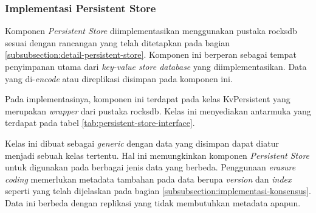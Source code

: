 \subsubsection{Implementasi Persistent Store}
\label{subsubsection:implementasi-persistent-store}

Komponen \textit{Persistent Store} diimplementasikan menggunakan pustaka rocksdb sesuai dengan rancangan yang telah ditetapkan pada bagian \ref{subsubsection:detail-persistent-store}. Komponen ini berperan sebagai tempat penyimpanan utama dari \textit{key-value store database} yang diimplementasikan. Data yang di-\textit{encode} atau direplikasi disimpan pada komponen ini.

Pada implementasinya, komponen ini terdapat pada kelas KvPersistent yang merupakan \textit{wrapper} dari pustaka rocksdb. Kelas ini menyediakan antarmuka yang terdapat pada tabel \ref{tab:persistent-store-interface}.

\begin{table}[h]
    \centering
    \caption{Antarmuka Persistent Store}
    \label{tab:persistent-store-interface}
\end{table}

Kelas ini dibuat sebagai \textit{generic} dengan data yang disimpan dapat diatur menjadi sebuah kelas tertentu. Hal ini memungkinkan komponen \textit{Persistent Store} untuk digunakan pada berbagai jenis data yang berbeda. Penggunaan \textit{erasure coding} memerlukan metadata tambahan pada data berupa \textit{version} dan \textit{index} seperti yang telah dijelaskan pada bagian \ref{subsubsection:implementasi-konsensus}. Data ini berbeda dengan replikasi yang tidak membutuhkan metadata apapun.